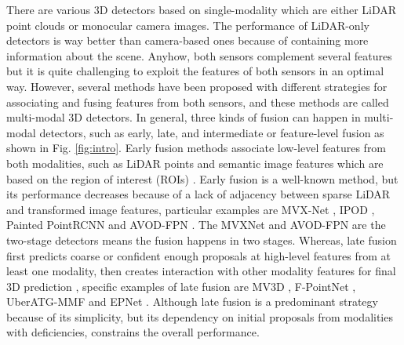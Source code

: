 \documentclass[10pt,twocolumn,letterpaper]{article}
\begin{document}
There are various 3D detectors based on single-modality which are either LiDAR point clouds or monocular camera images. The performance of LiDAR-only detectors \cite{graham2017submanifold,chen2022focal,yang2018pixor,yang2018hdnet,lang2019pointpillars,yan2018second,deng2021voxel,yin2021center}  is way better than camera-based ones \cite{brazil2019m3d, simonelli2019disentangling, wang2021fcos3d, huang2021bevdet, chen2020dsgn} because of containing more information about the scene. Anyhow, both sensors complement several features but it is quite challenging to exploit the features of both sensors in an optimal way. However, several methods have been proposed with different strategies for associating and fusing features from both sensors, and these methods are called multi-modal 3D detectors. In general, three kinds of fusion can happen in multi-modal detectors, such as early, late, and intermediate or feature-level fusion as shown in Fig. \ref{fig:intro}. Early fusion methods associate low-level features from both modalities, such as LiDAR points and semantic image features which are based on the region of interest (ROIs) \cite{liang2018deep,huang2020epnet,yin2021multimodal,li2022voxel}. Early fusion is a well-known method, but its performance decreases because of a lack of adjacency between sparse LiDAR and transformed image features, particular examples are MVX-Net \cite{sindagi2019mvx}, IPOD \cite{yang2018ipod}, Painted PointRCNN \cite{vora2020pointpainting} and AVOD-FPN \cite{ku2018joint}. The MVXNet and AVOD-FPN are the two-stage detectors means the fusion happens in two stages. 
Whereas, late fusion first predicts coarse or confident enough proposals at high-level features from at least one modality, then creates interaction with other modality features for final 3D prediction \cite{chen2017multi,ku2018joint,yoo20203d}, specific examples of late fusion are MV3D \cite{chen2017multi}, F-PointNet \cite{qi2018frustum}, UberATG-MMF \cite{liang2019multi} and EPNet \cite{huang2020epnet}. Although late fusion is a predominant strategy because of its simplicity, but its dependency on initial proposals from modalities with deficiencies, constrains the overall performance.
\end{document}
